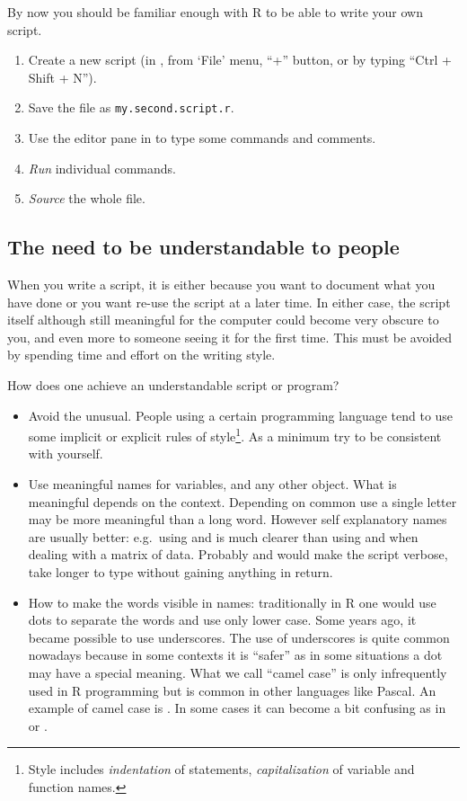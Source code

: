 \documentclass[krantz2]{krantz}\usepackage{knitr}%
\begin{document}
\begin{playground}
By now you should be familiar enough with R to be able to write your own script.
\begin{enumerate}
  \item Create a new \Rpgrm script (in \RStudio, from `File' menu, ``+'' button, or by typing ``Ctrl + Shift + N'').
  \item Save the file as \texttt{my.second.script.r}.
  \item Use the editor pane in \RStudio to type some \Rpgrm commands and comments.
  \item \emph{Run} individual commands.
  \item \emph{Source} the whole file.
\end{enumerate}
\end{playground}

\subsection{The need to be understandable to people}\label{sec:script:readability}

When you write a script, it is either because you want to document what you have done or you want re-use the script at a later time. In either case, the script itself although still meaningful for the computer could become very obscure to you, and even more to someone seeing it for the first time. This must be avoided by spending time and effort on the writing style.

How does one achieve an understandable script or program?
\begin{itemize}
  \item Avoid the unusual. People using a certain programming language tend to use some implicit or explicit rules of style\footnote{Style includes \textit{indentation} of statements, \textit{capitalization} of variable and function names.}. As a minimum try to be consistent with yourself.
  \item Use meaningful names for variables, and any other object. What is meaningful depends on the context. Depending on common use a single letter may be more meaningful than a long word. However self explanatory names are usually better: e.g.\ using  and  is much clearer than using  and  when dealing with a matrix of data. Probably  and  would make the script verbose, take longer to type without gaining anything in return.
  \item How to make the words visible in names: traditionally in R one would use dots to separate the words and use only lower case. Some years ago, it became possible to use underscores. The use of underscores is quite common nowadays because in some contexts it is ``safer'' as in some situations a dot may have a special meaning. What we call ``camel case'' is only infrequently used in R programming but is common in other languages like Pascal. An example of camel case is . In some cases it can become a bit confusing as in  or .
\end{itemize}
\end{document}
